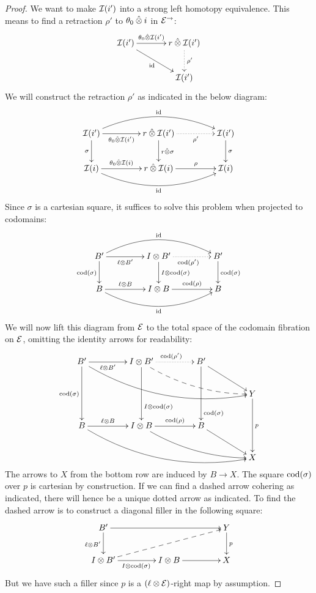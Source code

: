 \documentclass[reqno,10pt,a4paper,oneside]{amsart}
\begin{document}
\begin{proof}
We want to make $\cal{I}(i')$ into a strong left homotopy equivalence.
This means to find a retraction $\rho'$ to $\thetal \hatotimes i$ in $\catE^{\to}$:
\[
\xymatrix@C+1em{
  \cal{I}(i')
  \ar[r]^-{\thetal \hatotimes \cal{I}(i')}
  \ar[dr]_{\id}
&
  \intervalr \hatotimes \cal{I}(i')
  \ar@{.>}[d]^{\rho'}
\\&
  \cal{I}(i')
}
\]
We will construct the retraction $\rho'$ as indicated in the below diagram:
\[
\xymatrix@C+2em{
  \cal{I}(i')
  \ar[r]_-{\thetal \hatotimes \cal{I}(i')}
  \ar[d]_{\sigma}
  \ar@/^2em/[rr]^{\id}
&
  \intervalr \hatotimes \cal{I}(i')
  \ar@{.>}[r]_-{\rho'}
  \ar[d]^{\intervalr \hatotimes \sigma}
&
  \cal{I}(i')
  \ar[d]^{\sigma}
\\
  \cal{I}(i)
  \ar[r]^-{\thetal \hatotimes \cal{I}(i)}
  \ar@/_2em/[rr]_{\id}
&
  \intervalr \hatotimes \cal{I}(i)
  \ar[r]^-{\rho}
&
  \cal{I}(i)
}
\]
Since $\sigma$ is a cartesian square, it suffices to solve this problem when projected to codomains:
\[
\xymatrix@C+2em{
  B'
  \ar[r]_-{\intervall \otimes B'}
  \ar[d]_{\cod(\sigma)}
  \ar@/^2em/[rr]^{\id}
&
  \interval \otimes B'
  \ar@{.>}[r]_{\cod(\rho')}
  \ar[d]^{\interval \otimes \cod(\sigma)}
&
  B'
  \ar[d]^{\cod(\sigma)}
\\
  B
  \ar[r]^-{\intervall \otimes B}
  \ar@/_2em/[rr]_{\id}
&
  \interval \otimes B
  \ar[r]^-{\cod(\rho)}
&
  B
}
\]
We will now lift this diagram from $\catE$ to the total space of the codomain fibration on $\catE$, omitting the identity arrows for readability:
\[
\xymatrix@C+2em{
  B'
  \ar[r]_-{\intervall \otimes B'}
  \ar[dd]_{\cod(\sigma)}
  \ar@/_2em/[drrr]
&
  \interval \otimes B'
  \ar@{.>}[r]^{\cod(\rho')}
  \ar[dd]^(0.7){\interval \otimes \cod(\sigma)}
  \ar@{-->}@/_1em/[drr]
&
  B'
  \ar[dd]^(0.8){\cod(\sigma)}
  \ar[dr]
\\&&&
  Y
  \ar[dd]^{p}
\\
  B
  \ar[r]^-{\intervall \otimes B}
  \ar@/_2em/[drrr]
&
  \interval \otimes B
  \ar[r]^-{\cod(\rho)}
  \ar@/_1em/[drr]
&
  B
  \ar[dr]
\\&&&
  X
}
\]
The arrows to $X$ from the bottom row are induced by $B \to X$.
The square $\cod(\sigma)$ over $p$ is cartesian by construction.
If we can find a dashed arrow cohering as indicated, there will hence be a unique dotted arrow as indicated.
To find the dashed arrow is to construct a diagonal filler in the following square:
\[
\xymatrix@C+2em{
  B'
  \ar[rr]
  \ar[d]_{\intervall \otimes B'}
&&
  Y
  \ar[d]^{p}
\\
  \interval \otimes B'
  \ar[r]_{I \otimes \cod(\sigma)}
  \ar@{-->}[urr]
&
  \interval \otimes B
  \ar[r]
&
  X
}
\]
But we have such a filler since $p$ is a $(\intervall \otimes \catE)$-right map by assumption.


\end{proof}
\end{document}
